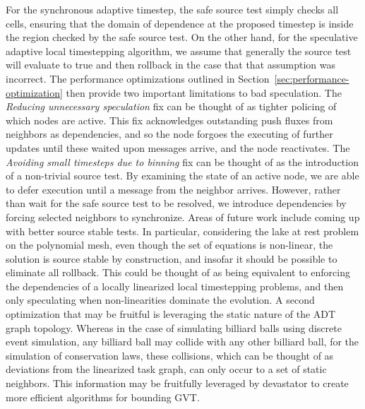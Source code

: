 For the synchronous adaptive timestep, the safe source test simply checks all cells, ensuring that the domain of dependence at the proposed timestep is inside the region checked by the safe source test. On the other hand, for the speculative adaptive local timestepping algorithm, we assume that generally the source test will evaluate to true and then rollback in the case that that assumption was incorrect. The performance optimizations outlined in Section~\ref{sec:performance-optimization} then provide two important limitations to bad speculation. The {\em Reducing unnecessary speculation} fix can be thought of as tighter policing of which nodes are active. This fix acknowledges outstanding push fluxes from neighbors as dependencies, and so the node forgoes the executing of further updates until these waited upon messages arrive, and the node reactivates. The {\em Avoiding small timesteps due to binning} fix can be thought of as the introduction of a non-trivial source test. By examining the state of an active node, we are able to defer execution until a message from the neighbor arrives. However, rather than wait for the safe source test to be resolved, we introduce dependencies by forcing selected neighbors to synchronize. 
Areas of future work include coming up with better source stable tests. In particular, considering the lake at rest problem on the polynomial mesh, even though the set of equations is non-linear, the solution is source stable by construction, and insofar it should be possible to eliminate all rollback. This could be thought of as being equivalent to enforcing the dependencies of a locally linearized local timestepping problems, and then only speculating when non-linearities dominate the evolution. A second optimization that may be fruitful is leveraging the static nature of the ADT graph topology. Whereas in the case of simulating billiard balls using discrete event simulation, any billiard ball may collide with any other billiard ball, for the simulation of conservation laws, these collisions, which can be thought of as deviations from the linearized task graph, can only occur to a set of static neighbors. This information may be fruitfully leveraged by devastator to create more efficient algorithms for bounding GVT.

